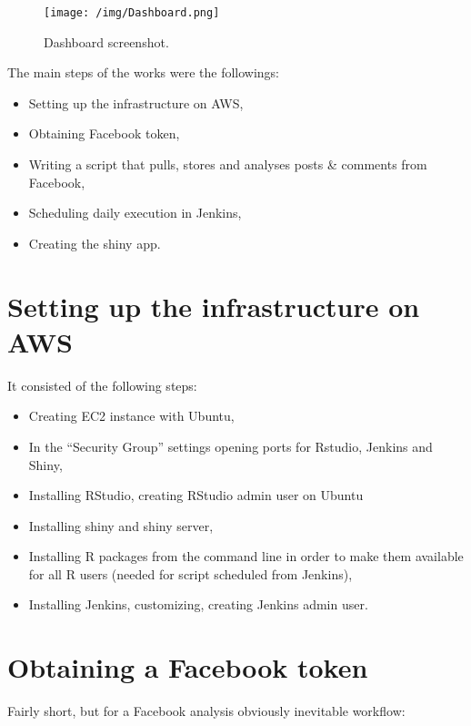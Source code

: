 \documentclass[]{article}
\providecommand{\tightlist}{%
  \setlength{\itemsep}{0pt}\setlength{\parskip}{0pt}}
\begin{document}
\begin{figure}[htbp]
\centering
\texttt{[image: /img/Dashboard.png]}
\caption{Dashboard screenshot.}
\end{figure}

The main steps of the works were the followings:

\begin{itemize}
\tightlist
\item
  Setting up the infrastructure on AWS,
\item
  Obtaining Facebook token,
\item
  Writing a script that pulls, stores and analyses posts \& comments
  from Facebook,
\item
  Scheduling daily execution in Jenkins,
\item
  Creating the shiny app.
\end{itemize}

\section{Setting up the infrastructure on
AWS}\label{setting-up-the-infrastructure-on-aws}

It consisted of the following steps:

\begin{itemize}
\tightlist
\item
  Creating EC2 instance with Ubuntu,
\item
  In the ``Security Group'' settings opening ports for Rstudio, Jenkins
  and Shiny,
\item
  Installing RStudio, creating RStudio admin user on Ubuntu
\item
  Installing shiny and shiny server,
\item
  Installing R packages from the command line in order to make them
  available for all R users (needed for script scheduled from Jenkins),
\item
  Installing Jenkins, customizing, creating Jenkins admin user.
\end{itemize}

\section{Obtaining a Facebook token}\label{obtaining-a-facebook-token}

Fairly short, but for a Facebook analysis obviously inevitable workflow:
\end{document}
